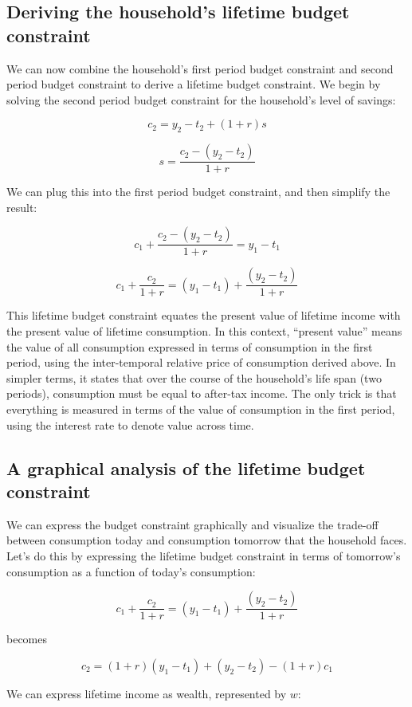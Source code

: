 \documentclass[12pt]{article}
\begin{document}
\subsection{Deriving the household's lifetime budget constraint}

We can now combine the household's first period budget constraint and second period budget constraint to derive a lifetime budget constraint. We begin by solving the second period budget constraint for the household's level of savings:

\[ c_2 = y_2 - t_2 + (1+r) s \]

\[ s = \frac{c_2 - (y_2 - t_2)}{1 + r} \]

We can plug this into the first period budget constraint, and then simplify the result:

\[ c_1 + \frac{c_2 - (y_2 - t_2)}{1 + r} = y_1 - t_1 \]

\[ c_1 + \frac{c_2}{1+r} = (y_1 - t_1) + \frac{(y_2-t_2)}{1+r} \]

This lifetime budget constraint equates the present value of lifetime income with the present value of lifetime consumption. In this context, ``present value'' means the value of all consumption expressed in terms of consumption in the first period, using the inter-temporal relative price of consumption derived above. In simpler terms, it states that over the course of the household's life span (two periods), consumption must be equal to after-tax income. The only trick is that everything is measured in terms of the value of consumption in the first period, using the interest rate to denote value across time.

\subsection{A graphical analysis of the lifetime budget constraint}

We can express the budget constraint graphically and visualize the trade-off between consumption today and consumption tomorrow that the household faces. Let's do this by expressing the lifetime budget constraint in terms of tomorrow's consumption as a function of today's consumption:

\[ c_1 + \frac{c_2}{1+r} = (y_1 - t_1) + \frac{(y_2-t_2)}{1+r} \]

becomes

\[ c_2 = (1+r) (y_1 - t_1) + (y_2 - t_2) - (1+r) c_1 \]

We can express lifetime income as wealth, represented by \(w\):
\end{document}
